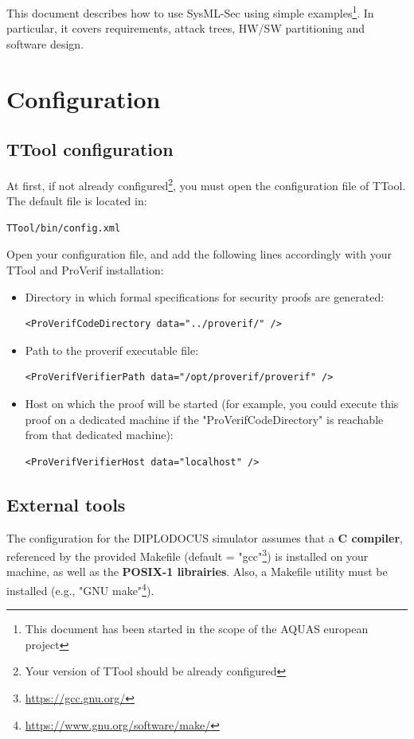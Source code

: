 \documentclass[12pt]{article}
\begin{document}
This document describes how to use SysML-Sec using simple examples\footnote{This document has been started in the scope of the AQUAS european project}. In particular, it covers requirements, attack trees, HW/SW partitioning and software design.

\newpage

\section{Configuration}\label{sec:conf}
\subsection{TTool configuration}
At first, if not already configured\footnote{Your version of TTool should be already configured}, you must open the configuration file of TTool. The default file is located in:
\begin{verbatim}
TTool/bin/config.xml
\end{verbatim}
Open your configuration file, and add the following lines accordingly with your TTool and ProVerif installation:
\begin{itemize}
\item Directory in which formal specifications for security proofs are generated:
\begin{verbatim}
<ProVerifCodeDirectory data="../proverif/" />
\end{verbatim}
\item Path to the proverif executable file:
\begin{verbatim}
<ProVerifVerifierPath data="/opt/proverif/proverif" />
\end{verbatim}
\item Host on which the proof will be started (for example, you could execute this proof on a dedicated machine if the "ProVerifCodeDirectory" is reachable from that dedicated machine):
\begin{verbatim}
<ProVerifVerifierHost data="localhost" />
\end{verbatim}
\end{itemize}


\subsection{External tools}
The  configuration for the DIPLODOCUS simulator assumes that a \textbf{C compiler}, referenced by the provided Makefile (default = "gcc"\footnote{\url{https://gcc.gnu.org/}}) is installed on your machine, as well as the \textbf{POSIX-1 librairies}. Also, a Makefile utility must be installed (e.g., "GNU make"\footnote{\url{https://www.gnu.org/software/make/}}).
\end{document}
